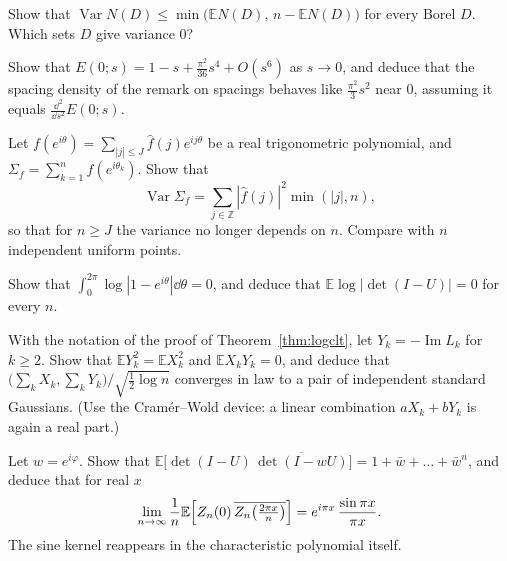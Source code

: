 \begin{exercise}[$\star$]\label{ex:varbound}
Show that $\operatorname{Var}N(D)\le\min\bigl(\mathbb EN(D),\,n-\mathbb EN(D)\bigr)$ for every Borel $D$. Which sets $D$ give variance $0$?
\end{exercise}

\begin{exercise}[$\star\star$]\label{ex:smallgap}
Show that $E(0;s)=1-s+\frac{\pi^2}{36}s^4+O(s^6)$ as $s\to0$, and deduce that the spacing density of the remark on spacings behaves like $\frac{\pi^2}3s^2$ near $0$, assuming it equals $\frac{\dd^2}{\dd s^2}E(0;s)$.
\end{exercise}

\begin{exercise}[$\star\star$]\label{ex:linearstat}
Let $f(e^{i\theta})=\sum_{|j|\le J}\hat f(j)e^{ij\theta}$ be a real trigonometric polynomial, and $\Sigma_f=\sum_{k=1}^nf(e^{i\theta_k})$. Show that
\[
\operatorname{Var}\Sigma_f=\sum_{j\in\mathbb Z}|\hat f(j)|^2\min(|j|,n),
\]
so that for $n\ge J$ the variance no longer depends on $n$. Compare with $n$ independent uniform points.
\end{exercise}

\begin{exercise}[$\star\star$]\label{ex:meanlog}
Show that $\int_0^{2\pi}\log|1-e^{i\theta}|\dd\theta=0$, and deduce that $\mathbb E\log|\det(I-U)|=0$ for every $n$.
\end{exercise}

\begin{exercise}[$\star\star$]\label{ex:argclt}
With the notation of the proof of Theorem~\ref{thm:logclt}, let $Y_k=-\operatorname{Im}L_k$ for $k\ge2$. Show that $\mathbb EY_k^2=\mathbb EX_k^2$ and $\mathbb EX_kY_k=0$, and deduce that $\bigl(\sum_kX_k,\sum_kY_k\bigr)/\sqrt{\frac12\log n}$ converges in law to a
pair of independent standard Gaussians. (Use the Cram\'er--Wold device: a linear combination $aX_k+bY_k$ is again a real part.)
\end{exercise}

\begin{exercise}[$\star\star\star$]\label{ex:ratio}
Let $w=e^{i\varphi}$. Show that $\mathbb E\bigl[\det(I-U)\,\overline{\det(I-wU)}\bigr]=1+\bar w+\dots+\bar w^n$, and deduce that for real $x$
\[
\lim_{n\to\infty}\frac1n\mathbb E\Bigl[Z_n(0)\,\overline{Z_n\bigl(\tfrac{2\pi x}n\bigr)}\Bigr]=e^{i\pi x}\,\frac{\sin\pi x}{\pi x}.
\]
The sine kernel reappears in the characteristic polynomial itself.
\end{exercise}

